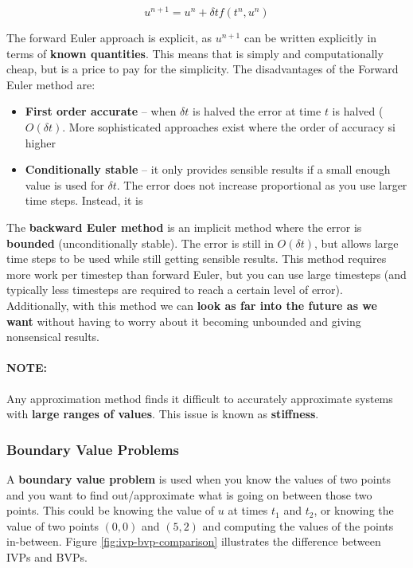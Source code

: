 \documentclass{article}
\begin{document}
\begin{equation}
	u^{n + 1} = u^n + \delta t f(t^n, u^n)
		\label{eq:ode-ivp-forward-euler}
\end{equation}

The forward Euler approach is explicit, as $u^{n+1}$ can be written explicitly in terms of \textbf{known quantities}. This means that is simply and computationally cheap, but is a price to pay for the simplicity. The disadvantages of the Forward Euler method are:
\begin{itemize}
	\item \textbf{First order accurate} -- when $\delta t$ is halved the error at time $t$ is halved ($O(\delta t)$. More sophisticated approaches exist where the order of accuracy si higher
	\item \textbf{Conditionally stable} -- it only provides sensible results if a small enough value is used for $\delta t$. The error does not increase proportional as you use larger time steps. Instead, it is
\end{itemize}

The \textbf{backward Euler method} is an implicit method where the error is \textbf{bounded} (unconditionally stable). The error is still in $O(\delta t)$, but allows large time steps to be used while still getting sensible results. This method requires more work per timestep than forward Euler, but you can use large timesteps (and typically less timesteps are required to reach a certain level of error). Additionally, with this method we can \textbf{look as far into the future as we want} without having to worry about it becoming unbounded and giving nonsensical results.

\paragraph{\textbf{NOTE: }} Any approximation method finds it difficult to accurately approximate systems with \textbf{large ranges of values}. This issue is known as \textbf{stiffness}.

\subsubsection{Boundary Value Problems}
\label{sec:bvp}

A \textbf{boundary value problem} is used when you know the values of two points and you want to find out/approximate what is going on between those two points. This could be knowing the value of $u$ at times $t_1$ and $t_2$, or knowing the value of two points $(0, 0)$ and $(5, 2)$ and computing the values of the points in-between. Figure \ref{fig:ivp-bvp-comparison} illustrates the difference between IVPs and BVPs.
\end{document}
